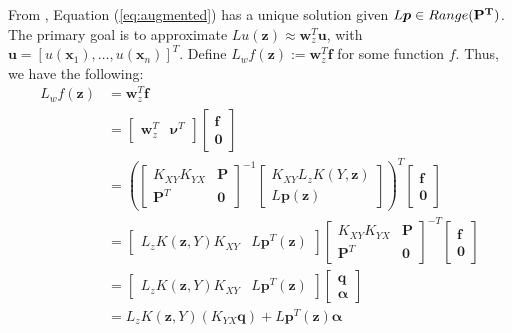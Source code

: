 \documentclass[11pt]{article}
\begin{document}
From \cite{Davydov2020}, Equation (\ref{eq:augmented}) has a unique solution given $L\bm{p} \in Range(\bf{P}^T)$. The primary goal is to approximate $Lu(\bm{z}) \approx \bm{w}^T_z \bm{u}$, with $\bm{u}=\left[ u(\bm{x}_1), \hdots, u(\bm{x}_n) \right]^T$. Define $L_w f(\bm{z}) := \bm{w}^T_z \bm{f}$ for some function $f$. Thus, we have the following:
\begin{align*}
	L_w f(\bm{z}) &= \bm{w}^T_z \bm{f}\\
			&= \begin{bmatrix}
					\bm{w}^T_z & \bm{\nu}^T
				\end{bmatrix}
				\begin{bmatrix}
					\bm{f} \\ \bm{0}
				\end{bmatrix}\\
			&= \left(
	\begin{bmatrix}
		K_{XY} K_{YX} & \bm{P} \\
		\bm{P}^T & \bm{0}
	\end{bmatrix}^{-1}
	\begin{bmatrix}
		K_{XY} L_z K(Y,\bm{z}) \\ L\bm{p}(\bm{z})
	\end{bmatrix}
				\right)^T 
				\begin{bmatrix}
					\bm{f} \\ \bm{0}
				\end{bmatrix}\\
			&= \begin{bmatrix}
					L_z K(\bm{z},Y) K_{XY} & L\bm{p}^T(\bm{z})
				\end{bmatrix}
	\begin{bmatrix}
		K_{XY} K_{YX} & \bm{P} \\
		\bm{P}^T & \bm{0}
	\end{bmatrix}^{-T}
				\begin{bmatrix}
					\bm{f} \\ \bm{0}
				\end{bmatrix}\\
			&= \begin{bmatrix}
					L_z K(\bm{z},Y) K_{XY} & L\bm{p}^T(\bm{z})
				\end{bmatrix}
				\begin{bmatrix}
					\bm{q} \\ \bm{\alpha}
				\end{bmatrix}\\
			&= L_z K(\bm{z},Y) \left(K_{YX} \bm{q}\right) + L\bm{p}^T (\bm{z}) \bm{\alpha}
\end{align*}
\end{document}
